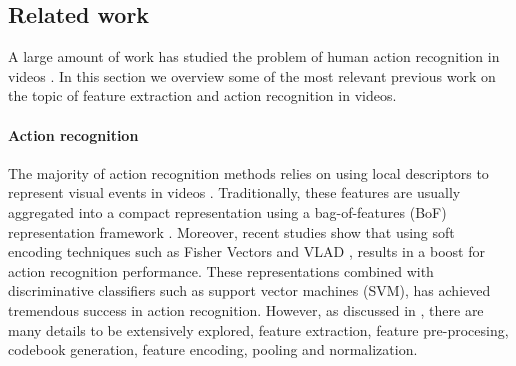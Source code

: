 \subsection{Related work}

A large amount of work has studied the problem of human action recognition in videos \cite{aggarwal2011}. In this section we overview some of the most relevant  previous work on the topic of feature extraction and action recognition in videos.

\paragraph{\textbf{Action recognition}}The majority of action recognition methods relies on using local descriptors to represent visual events in videos \cite{laptev2005,dollar2005,wang2011}. Traditionally, these features are usually aggregated into a compact representation using a bag-of-features (BoF) representation framework \cite{laptev2008}. Moreover, recent studies show that using soft encoding techniques such as  Fisher Vectors \cite{perronnin2010} and VLAD \cite{jegou2012}, results in a boost for action recognition performance. These representations combined with discriminative classifiers such as support vector machines (SVM), has achieved tremendous success in action recognition. However, as discussed in \cite{xwang2013}, there are many details to be extensively explored, \ie feature extraction, feature pre-procesing, codebook generation, feature encoding, pooling and normalization.

